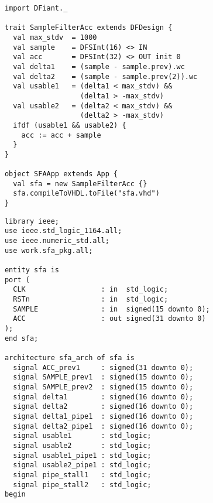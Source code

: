 \begin{table*}[t!]
  \centering
  \begin{minipage}[t][6.8cm][t]{0.46\linewidth}
    \centering
    \begin{verbatim}
      import DFiant._
      
      trait SampleFilterAcc extends DFDesign {
        val max_stdv  = 1000
        val sample    = DFSInt(16) <> IN
        val acc       = DFSInt(32) <> OUT init 0
        val delta1    = (sample - sample.prev).wc
        val delta2    = (sample - sample.prev(2)).wc
        val usable1   = (delta1 < max_stdv) && 
                        (delta1 > -max_stdv)
        val usable2   = (delta2 < max_stdv) && 
                        (delta2 > -max_stdv)
        ifdf (usable1 && usable2) {
          acc := acc + sample
        }
      }    
      
      object SFAApp extends App {
        val sfa = new SampleFilterAcc {}
        sfa.compileToVHDL.toFile("sfa.vhd")
      }
    \end{verbatim}
    \label{fig:SFADFiant}
  \end{minipage}
  \hfill
  \begin{minipage}[t][22cm][t]{0.51\linewidth}
    \centering
    \begin{verbatim}
      library ieee;
      use ieee.std_logic_1164.all;
      use ieee.numeric_std.all;
      use work.sfa_pkg.all;
      
      entity sfa is
      port (
        CLK                  : in  std_logic;
        RSTn                 : in  std_logic;
        SAMPLE               : in  signed(15 downto 0);
        ACC                  : out signed(31 downto 0)
      );
      end sfa;
      
      architecture sfa_arch of sfa is
        signal ACC_prev1     : signed(31 downto 0);
        signal SAMPLE_prev1  : signed(15 downto 0);
        signal SAMPLE_prev2  : signed(15 downto 0);
        signal delta1        : signed(16 downto 0);
        signal delta2        : signed(16 downto 0);
        signal delta1_pipe1  : signed(16 downto 0);
        signal delta2_pipe1  : signed(16 downto 0);
        signal usable1       : std_logic;
        signal usable2       : std_logic;
        signal usable1_pipe1 : std_logic;
        signal usable2_pipe1 : std_logic;
        signal pipe_stall1   : std_logic;
        signal pipe_stall2   : std_logic;
      begin
      

\end{verbatim}
\end{minipage}
\end{table*}
